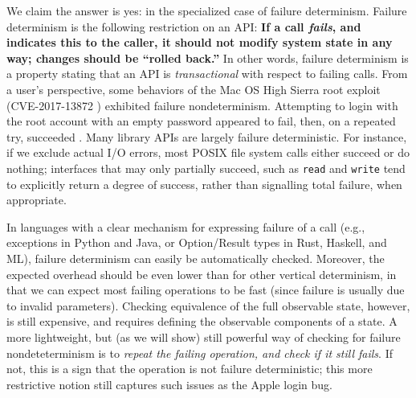 We claim the answer is yes: in the specialized case of  failure determinism.
Failure determinism is the following restriction on an API: {\bf If a call \emph{fails}, and indicates this to the caller, it should not modify system
  state in any way; changes should be ``rolled back.''}   In other words, failure determinism is a property stating that an API
is \emph{transactional} with respect to failing calls.  From a user's perspective, some behaviors of the Mac OS High Sierra
root exploit (CVE-2017-13872 \cite{applebug0}) exhibited failure
nondeterminism.  Attempting to login with the root account with an
empty password appeared to fail, then, on a repeated try, succeeded
\cite{applebug1,applebug2}.   Many library APIs are largely failure deterministic.  For instance, if
we exclude actual I/O errors, most POSIX file system calls either
succeed or do nothing; interfaces that may only partially succeed,
such as {\tt read} and {\tt write} tend to explicitly return a degree of success, rather than signalling total failure, when appropriate.  

In languages with a clear mechanism for expressing failure of a call
(e.g., exceptions in Python and Java, or Option/Result types in Rust,
Haskell, and ML), failure determinism can easily be automatically checked.
Moreover, the expected overhead should be even lower than for other vertical determinism, in that we can expect most failing
operations to be fast (since failure is usually
due to invalid parameters).  Checking equivalence of the full
observable state, however, is still expensive, and requires defining
the observable components of a state.  A more lightweight, but (as we
will show) still powerful way of checking for failure nondeteterminism is to
\emph{repeat the failing operation, and check if it still fails}.  If not,
this is a sign that the operation is not failure deterministic; this more restrictive notion still captures such issues as the Apple login bug. 

